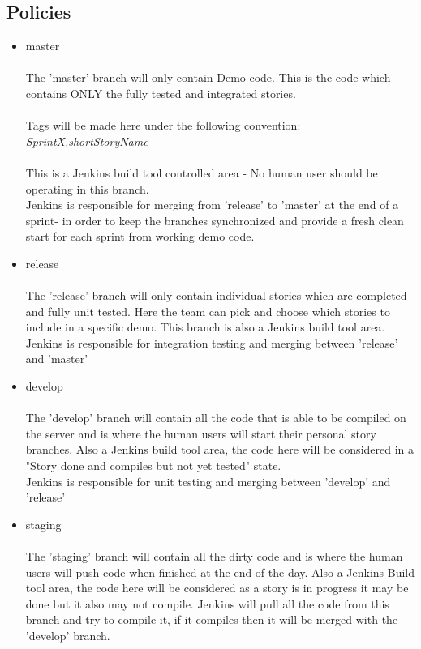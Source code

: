 \subsection {Policies}
\begin{itemize}
\item master\\ \\
The 'master' branch will only contain Demo code. This is the code which contains ONLY the fully tested and integrated stories.  \\\\Tags will be made here under the following convention:\\ \emph{SprintX.shortStoryName} \\\\
This is a Jenkins build tool controlled area - No human user should be operating in this branch. \\Jenkins is responsible for  merging from 'release' to 'master' at the end of a sprint- in order to keep the branches synchronized and provide a fresh clean start for each sprint from working demo code.\\
\item release\\ \\
The 'release' branch will only contain individual stories which are completed and fully unit tested. Here the team can pick and choose which stories to include in a specific demo. This branch is also a Jenkins build tool area. \\Jenkins is responsible for integration testing and merging between 'release' and 'master'
\item develop\\ \\
The 'develop' branch will contain all the code that is able to be compiled on the server and is where the human users will start their personal story branches. Also a Jenkins build tool area, the code here will be considered in a "Story done and compiles but not yet tested" state.\\ Jenkins is responsible for unit testing and merging between 'develop' and 'release'

\item staging \\ \\
The 'staging' branch will contain all the dirty code and is where the human users will push code when finished at the end of the day. Also a Jenkins Build tool area, the code here will be considered as a story is in progress it may be done but it also may not compile. Jenkins will pull all the code from this branch and try to compile it, if it compiles then it will be merged with the 'develop' branch.


\end{itemize}
